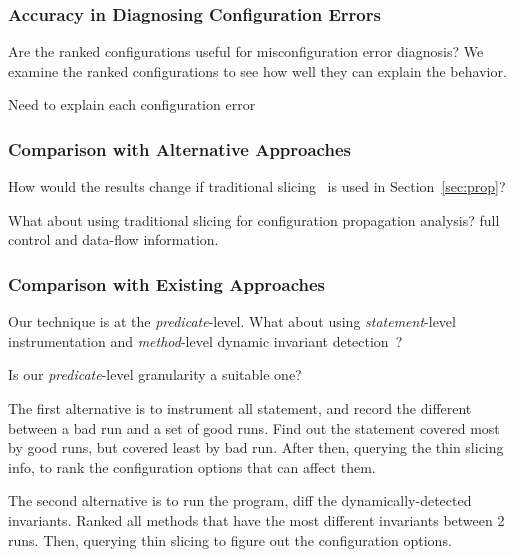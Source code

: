 \subsubsection{Accuracy in Diagnosing Configuration Errors}


Are the ranked configurations useful for misconfiguration error diagnosis?
We examine the ranked configurations to see how well they can explain the behavior.


Need to explain each configuration error


\subsubsection{Comparison with Alternative Approaches}


How would the results change if traditional slicing~\cite{Horwitz:1988} is used
in Section~\ref{sec:prop}?

What about using traditional slicing for configuration propagation analysis?
full control and data-flow information.

\subsubsection{Comparison with Existing Approaches}%


Our technique is at the \textit{predicate}-level. What about using
\textit{statement}-level instrumentation and \textit{method}-level dynamic invariant detection~\cite{Ernst:1999}?

Is our \textit{predicate}-level granularity a suitable one?

The first alternative is to instrument all statement, and record the different between a bad run and
a set of good runs. Find out the statement covered most by good runs, but covered least by bad run.
After then, querying the thin slicing info, to rank the configuration options that can affect them.


The second alternative is to run the program, diff the dynamically-detected invariants. Ranked all
methods that have the most different invariants between 2 runs. Then, querying thin slicing to
figure out the configuration options.


